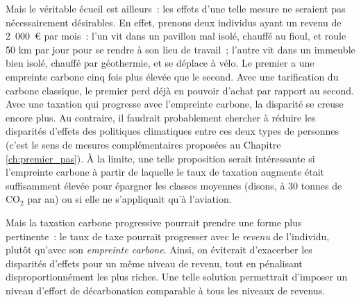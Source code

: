 \documentclass[a5paper,french,openany]{memoir}
\begin{document}
Mais le véritable écueil est ailleurs~: les effets d'une telle mesure ne seraient pas nécessairement désirables. En effet, prenons deux individus ayant un revenu de 2~000~\euro{} par mois~: l'un vit dans un pavillon mal isolé, chauffé au fioul, et roule 50 km par jour pour se rendre à son lieu de travail~; l'autre vit dans un immeuble bien isolé, chauffé par géothermie, et se déplace à vélo. Le premier a une empreinte carbone cinq fois plus élevée que le second. Avec une tarification du carbone classique, le premier perd déjà en pouvoir d'achat par rapport au second. Avec une taxation qui progresse avec l'empreinte carbone, la disparité se creuse encore plus. Au contraire, il faudrait probablement chercher à réduire les disparités d'effets des politiques climatiques entre ces deux types de personnes (c'est le sens de mesures complémentaires proposées au Chapitre \ref{ch:premier_pas}). À la limite, une telle proposition serait intéressante si l'empreinte carbone à partir de laquelle le taux de taxation augmente était suffisamment élevée pour épargner les classes moyennes (disons, à 30 tonnes de CO$_\text{2}$ par an) ou si elle ne s'appliquait qu'à l'aviation. %

Mais la taxation carbone progressive pourrait prendre une forme plus pertinente~: le taux de taxe pourrait progresser avec le \textit{revenu} de l'individu, plutôt qu'avec son \textit{empreinte carbone}. Ainsi, on éviterait d'exacerber les disparités d'effets pour un même niveau de revenu, tout en pénalisant disproportionnément les plus riches. Une telle solution permettrait d'imposer un niveau d'effort de décarbonation comparable à tous les niveaux de revenus. 
\end{document}

